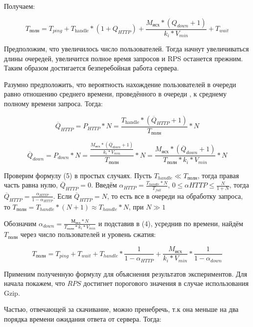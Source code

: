 \documentclass[12pt]{article}
\begin{document}
Получаем:

\[
    T_{\text{полн}} = T_{ping} + T_{\text{handle}}*(1 + Q_{HTTP}) + \frac{M_{\text{исх}}*(Q_{down} + 1)}{k_{i}*V_{min}} + T_{wait}
\]

Предположим, что увеличилось число пользователей. Тогда начнут увеличиваться длины очередей, увеличится полное время запросов
и RPS останется прежним. Таким образом достигается безперебойная работа сервера.

Разумно предположить, что вероятность нахождение пользователей в очереди равно отношению среднего времени, проведённого в очереди
, к среднему полному времени запроса. Тогда:

\begin{equation}
    \overline{Q}_{HTTP} = P_{HTTP} * N = \frac{T_{\text{handle}} * (\overline{Q}_{HTTP} + 1)}{T_{\text{полн}}} * N
\end{equation}

\begin{equation}
    \overline{Q}_{down} = P_{down} * N = \frac{\frac{M_{\text{исх}}*(\overline{Q}_{down} + 1)}{k_{i}*V_{min}}}{T_{\text{полн}}} * N = \frac{M_{\text{исх}}*(\overline{Q}_{down} + 1)}{T_{\text{полн}} * k_{i}*V_{min}} * N
\end{equation}

Проверим формулу (5) в простых случаях. Пусть $T_{handle} \ll T_{\text{полн}}$, тогда правая часть равна нулю, $\overline{Q}_{HTTP} = 0$.
Введём $\alpha_{HTTP} = \frac{T_{handle} * N}{T_{full}}$, $0 \le \alpha{HTTP} \le \frac{N}{1+N}$, тогда $\overline{Q}_{HTTP} = \frac{\alpha_{HTTP}}{1 - \alpha_{HTTP}}$.
Если $\overline{Q}_{HTTP} = N$, то есть все в очереди на обработку запроса,
то $T_{\text{полн}} = T_{handle}*(N+1) \approx T_{handle}*N$, при  $N \gg 1$

Обозначим $\alpha_{down} = \frac{М_{\text{исх}} * N}{T_{\text{полн}}*k_{i}*V_{min}}$ и подставив в (4),
усреднив по времени, найдём $T_{\text{полн}}$ через число пользователей и уровень сжатия:

\begin{equation}
    T_{\text{полн}} = T_{ping} + T_{wait} + T_{handle}*\frac{1}{1 - \alpha_{HTTP}} + \frac{M_{\text{исх}}}{k_{i}*V_{min}} * \frac{1}{1 - \alpha_{down}}
\end{equation}

Применим полученную формулу для объяснения результатов экспериментов. Для начала покажем, что $RPS$ достигнет порогового значения в случае использования Gzip.

Частью, отвечающей за скачивание, можно пренебречь, т.к она меньше на два порядка времени ожидания ответа от сервера. Тогда:
\end{document}
